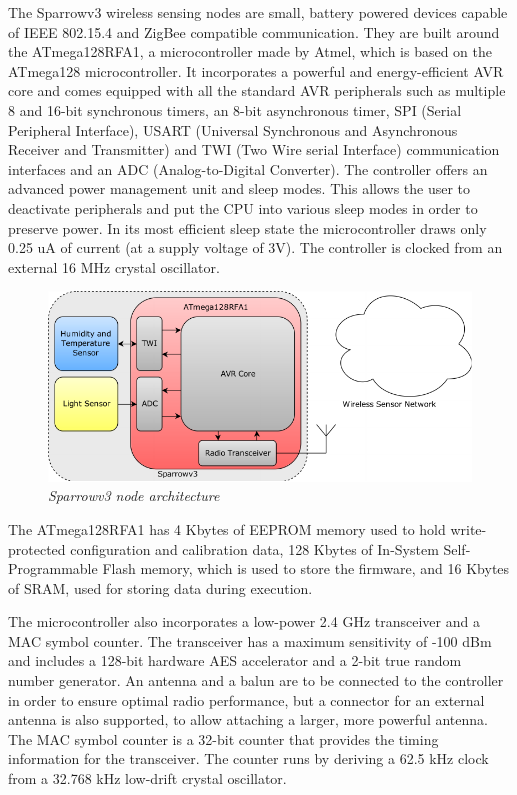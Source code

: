 The Sparrowv3 wireless sensing nodes are small, battery powered devices capable
of IEEE 802.15.4 and ZigBee compatible communication. They are built around the
\mbox{ATmega128RFA1}, a microcontroller made by Atmel, which is based on the
\mbox{ATmega128} microcontroller. It incorporates a powerful and
energy-efficient AVR core and comes equipped with all the standard AVR
peripherals such as multiple 8 and 16-bit synchronous timers, an 8-bit
asynchronous timer, SPI (Serial Peripheral Interface), USART (Universal
Synchronous and Asynchronous Receiver and Transmitter) and TWI (Two Wire serial
Interface) communication interfaces and an ADC (Analog-to-Digital Converter).
The controller offers an advanced power management unit and sleep modes. This
allows the user to deactivate peripherals and put the CPU into various sleep
modes in order to preserve power. In its most efficient sleep state the
microcontroller draws only 0.25 uA of current (at a supply voltage of 3V). The
controller is clocked from an external 16 MHz crystal oscillator.

\begin{figure}[ht]
	\begin{center}
		\includegraphics[width=\textwidth]{img/sparrowv3_node.pdf}
	\end{center}
	\caption{\small \itshape{Sparrowv3 node architecture}}
\end{figure}

The \mbox{ATmega128RFA1} has 4 Kbytes of EEPROM memory used to hold
write-protected configuration and calibration data, 128 Kbytes of In-System
Self-Programmable Flash memory, which is used to store the firmware, and 16
Kbytes of SRAM, used for storing data during execution.

The microcontroller also incorporates a low-power 2.4 GHz transceiver and a MAC
symbol counter. The transceiver has a maximum sensitivity of -100 dBm and
includes a 128-bit hardware AES accelerator and a 2-bit true random number
generator. An antenna and a balun are to be connected to the controller in
order to ensure optimal radio performance, but a connector for an external
antenna is also supported, to allow attaching a larger, more powerful antenna.
The MAC symbol counter is a 32-bit counter that provides the timing information
for the transceiver. The counter runs by deriving a 62.5 kHz clock from a
32.768 kHz low-drift crystal oscillator. 

